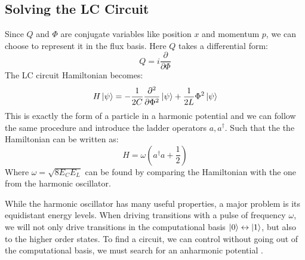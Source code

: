 \subsection{Solving the LC Circuit}\label{sec:forming_qubits}
Since $Q$ and $\Phi$ are conjugate variables like position $x$ and momentum $p$, we can choose to represent it in the flux basis. Here $Q$ takes a differential form:
\begin{equation}
    Q = i\frac{\partial}{\partial \Phi}
\end{equation}
The LC circuit Hamiltonian becomes:
\begin{equation}
    H \ket{\psi} = - \frac{1}{2C} \frac{\partial^2 }{\partial \Phi^2}\ket{\psi} + \frac{1}{2L} \Phi^2 \ket{\psi}
\end{equation}
This is exactly the form of a particle in a harmonic potential and we can follow the same procedure and introduce the ladder operators $a, a^\dagger$. Such that the the Hamiltonian can be written as:
\begin{equation}
    H = \omega \left(a^\dagger a + \frac12\right)
\end{equation}
Where $\omega = \sqrt{8 E_C E_L}$ can be found by comparing the Hamiltonian with the one from the harmonic oscillator.

While the harmonic oscillator has many useful properties, a major problem is its equidistant energy levels. When driving transitions with a pulse of frequency $\omega$, we will not only drive transitions in the computational basis $\ket{0} \leftrightarrow\ket{1}$, but also to the higher order states. To find a circuit, we can control without going out of the computational basis, we must search for an anharmonic potential \cite{lc_circuit}.

